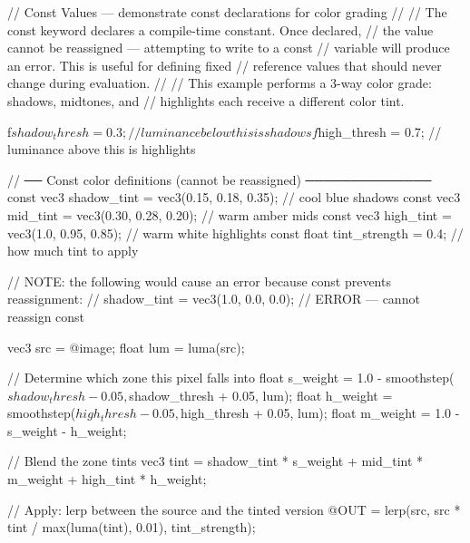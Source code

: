 // Const Values — demonstrate const declarations for color grading
//
// The const keyword declares a compile-time constant. Once declared,
// the value cannot be reassigned — attempting to write to a const
// variable will produce an error. This is useful for defining fixed
// reference values that should never change during evaluation.
//
// This example performs a 3-way color grade: shadows, midtones, and
// highlights each receive a different color tint.

f$shadow_thresh = 0.3;    // luminance below this is shadows
f$high_thresh = 0.7;      // luminance above this is highlights

// ── Const color definitions (cannot be reassigned) ──────────────
const vec3 shadow_tint = vec3(0.15, 0.18, 0.35);    // cool blue shadows
const vec3 mid_tint    = vec3(0.30, 0.28, 0.20);     // warm amber mids
const vec3 high_tint   = vec3(1.0, 0.95, 0.85);      // warm white highlights
const float tint_strength = 0.4;                      // how much tint to apply

// NOTE: the following would cause an error because const prevents reassignment:
//   shadow_tint = vec3(1.0, 0.0, 0.0);   // ERROR — cannot reassign const

vec3 src = @image;
float lum = luma(src);

// Determine which zone this pixel falls into
float s_weight = 1.0 - smoothstep($shadow_thresh - 0.05, $shadow_thresh + 0.05, lum);
float h_weight = smoothstep($high_thresh - 0.05, $high_thresh + 0.05, lum);
float m_weight = 1.0 - s_weight - h_weight;

// Blend the zone tints
vec3 tint = shadow_tint * s_weight + mid_tint * m_weight + high_tint * h_weight;

// Apply: lerp between the source and the tinted version
@OUT = lerp(src, src * tint / max(luma(tint), 0.01), tint_strength);
